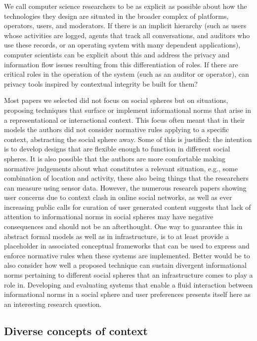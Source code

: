 \documentclass[../thesis.tex]{subfiles}
\begin{document}
We call computer science researchers to be as explicit as possible about
how the technologies they design are situated in the broader complex of
platforms, operators, users, and moderators. If there is an implicit
hierarchy (such as users whose activities are logged, agents that track
all conversations, and auditors who use these records, or an operating
system with many dependent applications), computer scientists can be
explicit about this and address the privacy and information flow issues
resulting from this differentiation of roles. If there are critical
roles in the operation of the system (such as an auditor or operator),
can privacy tools inspired by contextual integrity be built for them?

Most papers we selected did not focus on social spheres but on
situations, proposing techniques that surface or implement
informational norms that arise in a representational or interactional
context. This focus often meant that in their models the authors did
not consider normative rules applying to a specific context,
abstracting the social sphere away. Some of this is justified: the
intention is to develop designs that are flexible enough to function in
different social spheres. It is also possible that the authors are more
comfortable making normative judgements about what constitutes a
relevant situation, e.g., some combination of location and activity,
these also being things that the researchers can measure using sensor
data. However, the numerous research papers showing user concerns due
to context clash in online social networks, as well as ever increasing
public calls for curation of user generated content suggests that lack
of attention to informational norms in social spheres may have negative
consequences and should not be an afterthought. One way to guarantee
this in abstract formal models as well as in infrastructure, is to at
least provide a placeholder in associated conceptual frameworks that
can be used to express and enforce normative rules when these systems
are implemented. Better would be to also consider how well a proposed
technique can sustain divergent informational norms pertaining to
different social spheres that an infrastructure comes to play a role
in. Developing and evaluating systems that enable a fluid interaction
between informational norms in a social sphere and user preferences
presents itself here as an interesting research question.

\subsection{Diverse concepts of context}
\label{CI5.2}
\end{document}
